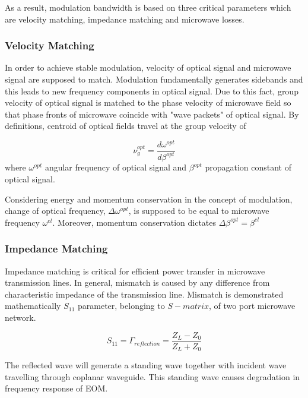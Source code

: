 \documentclass[thesis]{deutez}
\begin{document}
    As a result, modulation bandwidth is based on three critical parameters which are velocity matching, impedance matching and microwave losses.
    
    \subsubsection{Velocity Matching}
    In order to achieve stable modulation, velocity of optical signal and microwave signal are supposed to match. Modulation fundamentally generates sidebands and this leads to new frequency components in optical signal. Due to this fact, group velocity of optical signal is matched to the phase velocity of microwave field so that phase fronts of microwave coincide with "wave packets" of optical signal. By definitions, centroid of optical fields travel at the group velocity of 

    \begin{equation}
        \nu_{g}^{opt} = \frac{d\omega^{opt}}{d\beta^{opt}}
    \end{equation}
    where $\omega^{opt}$ angular frequency of optical signal and $\beta^{opt}$ propagation constant of optical signal.

    Considering energy and momentum conservation in the concept of modulation, change of optical frequency, $\Delta\omega^{opt}$, is supposed to be equal to microwave frequency $\omega^{el}$. Moreover, momentum conservation dictates $\Delta\beta^{opt} =  \beta^{el}$
    
    \subsubsection{Impedance Matching}

    Impedance matching is critical for efficient power transfer in microwave transmission lines. In general, mismatch is caused by any difference from characteristic impedance of the transmission line. Mismatch is demonstrated mathematically $S_{11}$ parameter, belonging to $S-matrix$, of two port microwave network.

    \begin{equation}
        S_{11} = \Gamma_{reflection} = \frac{Z_L-Z_0}{Z_L+Z_0} 
        \label{eq:reflection_coeff}
    \end{equation}

    The reflected wave will generate a standing wave together with incident wave travelling through coplanar waveguide. This standing wave causes degradation in frequency response of EOM. 
\end{document}
